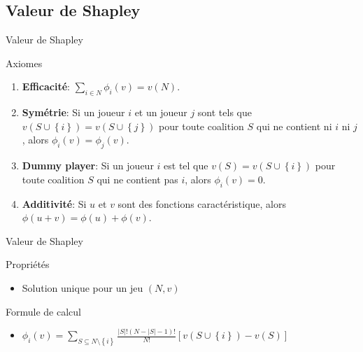 \documentclass{isimabeamer}
\begin{document}
\subsection{Valeur de Shapley}
\begin{frame}{Valeur de Shapley}
\begin{block}{Axiomes}
\begin{enumerate}
    \item \textbf{Efficacité}: $\sum_{i \in N} \phi_i(v) = v(N)$.
    \item \textbf{Symétrie}: Si un joueur $i$ et un joueur $j$ sont tels que $v\left ( S \cup \left \{ i \right \} \right ) = v \left ( S \cup \left \{ j \right \} \right )$ pour toute coalition $S$ qui ne contient ni $i$ ni $j$, alors $\phi_i(v) = \phi_j(v)$. 
    \item \textbf{Dummy player}: Si un joueur $i$ est tel que $v(S) = v\left ( S \cup \left \{ i \right \} \right )$ pour toute coalition $S$ qui ne contient pas $i$, alors $\phi_i(v) = 0$.
    \item \textbf{Additivité}: Si $u$ et $v$ sont des fonctions caractéristique, alors $\phi(u+v) = \phi(u) + \phi(v)$.
\end{enumerate}

\end{block}


\end{frame}

\begin{frame}{Valeur de Shapley}
\begin{block}{Propriétés}
\begin{itemize}
    \item Solution unique pour un jeu $(N, v)$
\end{itemize}
\end{block}

\begin{block}{Formule de calcul}
\begin{itemize}
    \item $\phi_i(v) = \sum_{S \subseteq N \setminus \left \{ i \right \}} \frac{\left | S \right |!\left ( N- \left | S \right | -1 \right)!}{N!} \left [ v(S \cup \left \{ i \right \}) - v(S) \right ]$
\end{itemize}
\end{block}
\end{frame}


\end{document}
